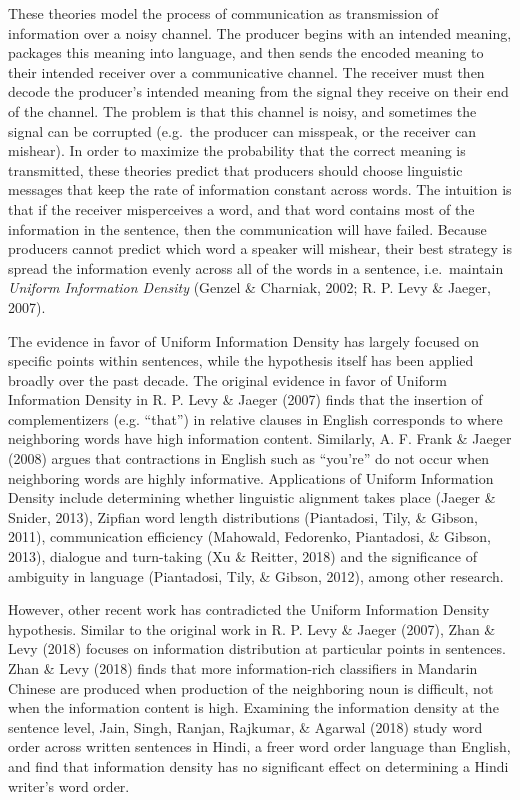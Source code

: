 \documentclass[10pt, letterpaper]{article}
\begin{document}
These theories model the process of communication as transmission of
information over a noisy channel. The producer begins with an intended
meaning, packages this meaning into language, and then sends the encoded
meaning to their intended receiver over a communicative channel. The
receiver must then decode the producer's intended meaning from the
signal they receive on their end of the channel. The problem is that
this channel is noisy, and sometimes the signal can be corrupted
(e.g.~the producer can misspeak, or the receiver can mishear). In order
to maximize the probability that the correct meaning is transmitted,
these theories predict that producers should choose linguistic messages
that keep the rate of information constant across words. The intuition
is that if the receiver misperceives a word, and that word contains most
of the information in the sentence, then the communication will have
failed. Because producers cannot predict which word a speaker will
mishear, their best strategy is spread the information evenly across all
of the words in a sentence, i.e.~maintain \emph{Uniform Information
Density} (Genzel \& Charniak, 2002; R. P. Levy \& Jaeger, 2007).

The evidence in favor of Uniform Information Density has largely focused
on specific points within sentences, while the hypothesis itself has
been applied broadly over the past decade. The original evidence in
favor of Uniform Information Density in R. P. Levy \& Jaeger (2007)
finds that the insertion of complementizers (e.g. ``that'') in relative
clauses in English corresponds to where neighboring words have high
information content. Similarly, A. F. Frank \& Jaeger (2008) argues that
contractions in English such as ``you're'' do not occur when neighboring
words are highly informative. Applications of Uniform Information
Density include determining whether linguistic alignment takes place
(Jaeger \& Snider, 2013), Zipfian word length distributions (Piantadosi,
Tily, \& Gibson, 2011), communication efficiency (Mahowald, Fedorenko,
Piantadosi, \& Gibson, 2013), dialogue and turn-taking (Xu \& Reitter,
2018) and the significance of ambiguity in language (Piantadosi, Tily,
\& Gibson, 2012), among other research.

However, other recent work has contradicted the Uniform Information
Density hypothesis. Similar to the original work in R. P. Levy \& Jaeger
(2007), Zhan \& Levy (2018) focuses on information distribution at
particular points in sentences. Zhan \& Levy (2018) finds that more
information-rich classifiers in Mandarin Chinese are produced when
production of the neighboring noun is difficult, not when the
information content is high. Examining the information density at the
sentence level, Jain, Singh, Ranjan, Rajkumar, \& Agarwal (2018) study
word order across written sentences in Hindi, a freer word order
language than English, and find that information density has no
significant effect on determining a Hindi writer's word order.
\end{document}

